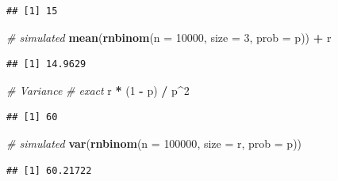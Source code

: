 \documentclass[]{book}
\makeatletter
\newenvironment{Shaded}{\begin{snugshade}}{\end{snugshade}}
\newcommand{\CommentTok}[1]{\textcolor[rgb]{0.56,0.35,0.01}{\textit{#1}}}
\newcommand{\DataTypeTok}[1]{\textcolor[rgb]{0.13,0.29,0.53}{#1}}
\newcommand{\DecValTok}[1]{\textcolor[rgb]{0.00,0.00,0.81}{#1}}
\newcommand{\KeywordTok}[1]{\textcolor[rgb]{0.13,0.29,0.53}{\textbf{#1}}}
\newcommand{\NormalTok}[1]{#1}
\newcommand{\OperatorTok}[1]{\textcolor[rgb]{0.81,0.36,0.00}{\textbf{#1}}}
\newcommand{\StringTok}[1]{\textcolor[rgb]{0.31,0.60,0.02}{#1}}
\newenvironment{kframe}{%
\medskip{}
\setlength{\fboxsep}{.8em}
 \def\at@end@of@kframe{}%
 \ifinner\ifhmode%
  \def\at@end@of@kframe{\end{minipage}}%
  \begin{minipage}{\columnwidth}%
 \fi\fi%
 \def\FrameCommand##1{\hskip\@totalleftmargin \hskip-\fboxsep
 \colorbox{shadecolor}{##1}\hskip-\fboxsep
     \hskip-\linewidth \hskip-\@totalleftmargin \hskip\columnwidth}%
 \MakeFramed {\advance\hsize-\width
   \@totalleftmargin\z@ \linewidth\hsize
   \@setminipage}}%
 {\par\unskip\endMakeFramed%
 \at@end@of@kframe}
\renewenvironment{Shaded}{\begin{kframe}}{\end{kframe}}
\makeatother
\begin{document}
\begin{verbatim}
## [1] 15
\end{verbatim}

\begin{Shaded}
\begin{Highlighting}[]
\CommentTok{# simulated}
\KeywordTok{mean}\NormalTok{(}\KeywordTok{rnbinom}\NormalTok{(}\DataTypeTok{n =} \DecValTok{10000}\NormalTok{, }\DataTypeTok{size =} \DecValTok{3}\NormalTok{, }\DataTypeTok{prob =}\NormalTok{ p)) }\OperatorTok{+}\StringTok{ }\NormalTok{r}
\end{Highlighting}
\end{Shaded}

\begin{verbatim}
## [1] 14.9629
\end{verbatim}

\begin{Shaded}
\begin{Highlighting}[]
\CommentTok{# Variance}
\CommentTok{# exact}
\NormalTok{r }\OperatorTok{*}\StringTok{ }\NormalTok{(}\DecValTok{1} \OperatorTok{-}\StringTok{ }\NormalTok{p) }\OperatorTok{/}\StringTok{ }\NormalTok{p}\OperatorTok{^}\DecValTok{2}
\end{Highlighting}
\end{Shaded}

\begin{verbatim}
## [1] 60
\end{verbatim}

\begin{Shaded}
\begin{Highlighting}[]
\CommentTok{# simulated}
\KeywordTok{var}\NormalTok{(}\KeywordTok{rnbinom}\NormalTok{(}\DataTypeTok{n =} \DecValTok{100000}\NormalTok{, }\DataTypeTok{size =}\NormalTok{ r, }\DataTypeTok{prob =}\NormalTok{ p))}
\end{Highlighting}
\end{Shaded}

\begin{verbatim}
## [1] 60.21722
\end{verbatim}
\end{document}
